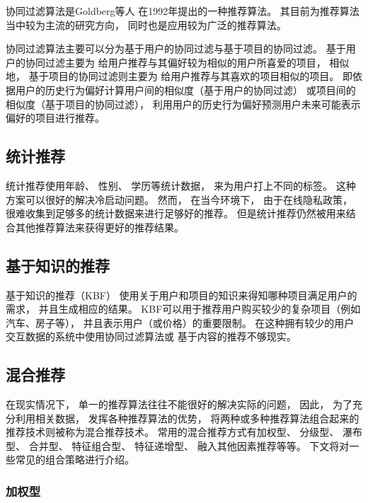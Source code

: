 协同过滤算法是Goldberg等人\cite{goldbergUsingCollaborativeFiltering1992}
在1992年提出的一种推荐算法。
其目前为推荐算法当中较为主流的研究方向，
同时也是应用较为广泛的推荐算法。

协同过滤算法主要可以分为基于用户的协同过滤与基于项目的协同过滤。
基于用户的协同过滤主要为
给用户推荐与其偏好较为相似的用户所喜爱的项目，
相似地，
基于项目的协同过滤则主要为
给用户推荐与其喜欢的项目相似的项目。
即依据用户的历史行为偏好计算用户间的相似度（基于用户的协同过滤）
或项目间的相似度（基于项目的协同过滤），
利用用户的历史行为偏好预测用户未来可能表示偏好的项目进行推荐。

\subsection{统计推荐}

统计推荐使用年龄、
性别、
学历等统计数据，
来为用户打上不同的标签。
这种方案可以很好的解决冷启动问题。
然而，
在当今环境下，
由于在线隐私政策，
很难收集到足够多的统计数据来进行足够好的推荐。
但是统计推荐仍然被用来结合其他推荐算法来获得更好的推荐结果。

\subsection{基于知识的推荐}

基于知识的推荐（KBF）
使用关于用户和项目的知识来得知哪种项目满足用户的需求，
并且生成相应的结果\cite{burkeKnowledgeBasedRecommenderSystems2000}。
KBF可以用于推荐用户购买较少的复杂项目（例如汽车、房子等），
并且表示用户（或价格）的重要限制\cite{felfernigConstraintbasedRecommenderSystems2008}。
在这种拥有较少的用户交互数据的系统中使用协同过滤算法或
基于内容的推荐不够现实。

\subsection{混合推荐}

在现实情况下，
单一的推荐算法往往不能很好的解决实际的问题，
因此，
为了充分利用相关数据，
发挥各种推荐算法的优势，
将两种或多种推荐算法组合起来的推荐技术则被称为混合推荐技术。
常用的混合推荐方式有加权型、
分级型、
瀑布型、
合并型、
特征组合型、
特征递增型、
融入其他因素推荐等等。
下文将对一些常见的组合策略进行介绍\cite{heJiYuJuanJiShenJingWangLuoDeYinLeTuiJianXiTong2019}。

\subsubsection{加权型}

